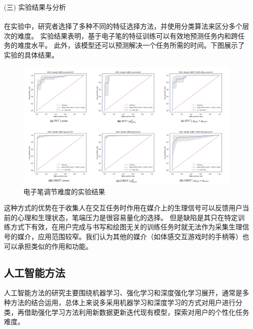 \documentclass[12pt]{article}
\begin{document}
            (三) 实验结果与分析\paragraph{}
            在实验中，研究者选择了多种不同的特征选择方法，并使用分类算法来区分多个层次的难度。
            实验结果表明，基于电子笔的特征训练可以有效地预测任务内和跨任务的难度水平。
            此外，该模型还可以预测解决一个任务所需的时间。下图展示了实验的具体结果。

            \begin{figure}[H]
        
            	\centering
            	\includegraphics[scale=0.3]{images/pen_result.png}
            	\caption{电子笔调节难度的实验结果}
            	\label{fig:label}
            \end{figure}

            这种方式的优势在于收集人在交互任务时作用在媒介上的生理信号可以反馈用户当前的心理和生理状态，笔端压力是很容易量化的选择。
            但是缺陷是其只在特定训练方式下有效，在用户完成与书写和绘图无关的训练任务时就无法作为采集生理信号的媒介，应用范围较窄。我们认为其他的媒介（如体感交互游戏时的手柄等）也可以承担类似的作用和功能。
            


            
        \subsection{人工智能方法}
        人工智能方法的研究主要围绕机器学习、强化学习和深度强化学习展开，通常是多种方法的结合运用，总体上来说多采用机器学习和深度学习的方式对用户进行分类，再借助强化学习方法利用新数据更新迭代现有模型，探索对用户的个性化任务难度。
\end{document}
